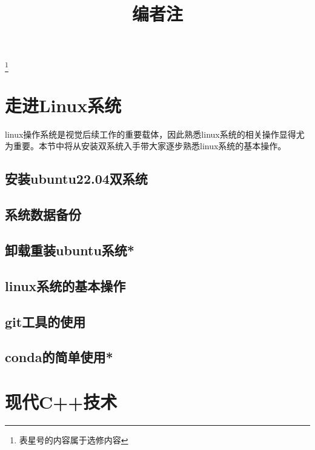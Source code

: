\documentclass[withoutpreface,bwprint]{cumcmthesis} %
\begin{document}
\title{编者注}

\maketitle

\newpage

\tableofcontents
\footnote{表星号的内容属于选修内容}
\newpage

\section{走进Linux系统}

linux操作系统是视觉后续工作的重要载体，因此熟悉linux系统的相关操作显得尤为重要。本节中将从安装双系统入手带大家逐步熟悉linux系统的基本操作。

\subsection{安装ubuntu22.04双系统}



\subsection{系统数据备份}



\subsection{卸载重装ubuntu系统*}



\subsection{linux系统的基本操作}



\subsection{git工具的使用}



\subsection{conda的简单使用*}



\section{现代C++技术}
\end{document}

